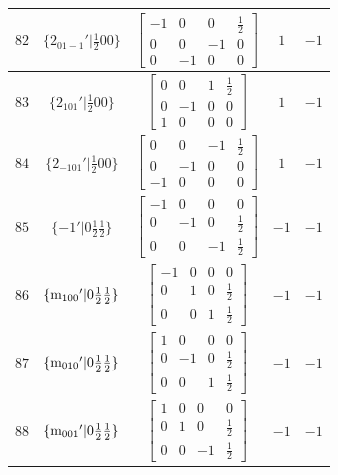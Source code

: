 \documentclass[fleqn,8pt]{jsarticle}
\begin{document}
\begin{longtable}{ccccc}
$ 82 $ & $ \{2{}_{01-1}{}'|\frac{1}{2} 0 0\} $ & $ \begin{bmatrix} -1 & 0 & 0 & \frac{1}{2} \\ 0 & 0 & -1 & 0 \\ 0 & -1 & 0 & 0 \end{bmatrix} $ & $ 1 $ & $ -1 $ \\ \hline
$ 83 $ & $ \{2{}_{101}{}'|\frac{1}{2} 0 0\} $ & $ \begin{bmatrix} 0 & 0 & 1 & \frac{1}{2} \\ 0 & -1 & 0 & 0 \\ 1 & 0 & 0 & 0 \end{bmatrix} $ & $ 1 $ & $ -1 $ \\ \hline
$ 84 $ & $ \{2{}_{-101}{}'|\frac{1}{2} 0 0\} $ & $ \begin{bmatrix} 0 & 0 & -1 & \frac{1}{2} \\ 0 & -1 & 0 & 0 \\ -1 & 0 & 0 & 0 \end{bmatrix} $ & $ 1 $ & $ -1 $ \\ \hline
$ 85 $ & $ \{-1{}'|0 \frac{1}{2} \frac{1}{2}\} $ & $ \begin{bmatrix} -1 & 0 & 0 & 0 \\ 0 & -1 & 0 & \frac{1}{2} \\ 0 & 0 & -1 & \frac{1}{2} \end{bmatrix} $ & $ -1 $ & $ -1 $ \\ \hline
$ 86 $ & $ \{{\rm m}_{100}{}'|0 \frac{1}{2} \frac{1}{2}\} $ & $ \begin{bmatrix} -1 & 0 & 0 & 0 \\ 0 & 1 & 0 & \frac{1}{2} \\ 0 & 0 & 1 & \frac{1}{2} \end{bmatrix} $ & $ -1 $ & $ -1 $ \\ \hline
$ 87 $ & $ \{{\rm m}_{010}{}'|0 \frac{1}{2} \frac{1}{2}\} $ & $ \begin{bmatrix} 1 & 0 & 0 & 0 \\ 0 & -1 & 0 & \frac{1}{2} \\ 0 & 0 & 1 & \frac{1}{2} \end{bmatrix} $ & $ -1 $ & $ -1 $ \\ \hline
$ 88 $ & $ \{{\rm m}_{001}{}'|0 \frac{1}{2} \frac{1}{2}\} $ & $ \begin{bmatrix} 1 & 0 & 0 & 0 \\ 0 & 1 & 0 & \frac{1}{2} \\ 0 & 0 & -1 & \frac{1}{2} \end{bmatrix} $ & $ -1 $ & $ -1 $ \\ \hline

\end{longtable}
\end{document}
